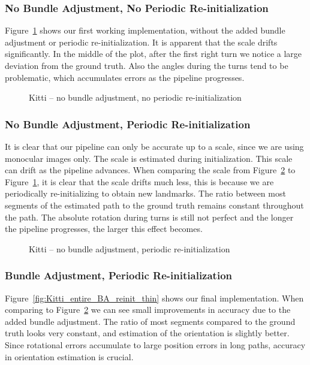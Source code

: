 \documentclass[11pt]{article}
\newlength\figureheight
\newlength\figurewidth
\begin{document}
\subsubsection{No Bundle Adjustment, No Periodic Re-initialization}
Figure~\ref{fig:Kitti_entire_no_BA_no_reinit_thin} shows our first working implementation, without the added bundle adjustment or periodic re-initialization. It is apparent that the scale drifts significantly. In the middle of the plot, after the first right turn we notice a large deviation from the ground truth. Also the angles during the turns tend to be problematic, which accumulates errors as the pipeline progresses.

\begin{figure}[h]
	\centering
	\setlength\figureheight{8cm} 
	\setlength\figurewidth{11cm}
	
	\caption{Kitti -- no bundle adjustment, no periodic re-initialization}
	\label{fig:Kitti_entire_no_BA_no_reinit_thin}
\end{figure}

\subsubsection{No Bundle Adjustment, Periodic Re-initialization}
It is clear that our pipeline can only be accurate up to a scale, since we are using monocular images only. The scale is estimated during initialization. This scale can drift as the pipeline advances. When comparing the scale from Figure~\ref{fig:Kitti_entire_no_BA_reinit_thin} to Figure~\ref{fig:Kitti_entire_no_BA_no_reinit_thin}, it is clear that the scale drifts much less, this is because we are periodically re-initializing to obtain new landmarks. The ratio between most segments of the estimated path to the ground truth remains constant throughout the path. The absolute rotation during turns is still not perfect and the longer the pipeline progresses, the larger this effect becomes.

\begin{figure}[h]
	\centering
	\setlength\figureheight{8cm} 
	\setlength\figurewidth{11cm}
	
	\caption{Kitti -- no bundle adjustment, periodic re-initialization}
	\label{fig:Kitti_entire_no_BA_reinit_thin}
\end{figure}

\subsubsection{Bundle Adjustment, Periodic Re-initialization}
Figure~\ref{fig:Kitti_entire_BA_reinit_thin} shows our final implementation. When comparing to Figure~\ref{fig:Kitti_entire_no_BA_reinit_thin} we can see small improvements in accuracy due to the added bundle adjustment. The ratio of most segments compared to the ground truth looks very constant, and estimation of the orientation is slightly better. Since rotational errors accumulate to large position errors in long paths, accuracy in orientation estimation is crucial.
\end{document}
